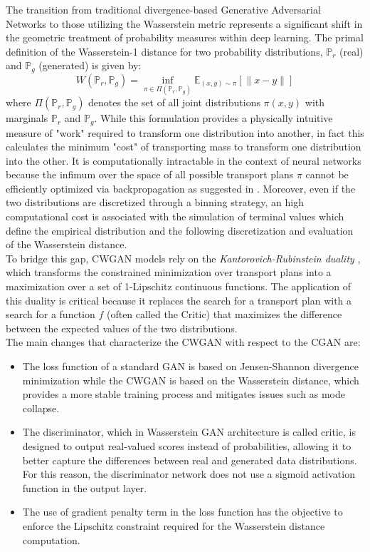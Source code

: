 The transition from traditional divergence-based
Generative Adversarial Networks to those utilizing the Wasserstein metric 
represents a significant shift in the geometric treatment of probability 
measures within deep learning. 
The primal definition of the Wasserstein-1 distance 
for two probability distributions, $\mathbb{P}_r$ (real) and $\mathbb{P}_g$ (generated) is given 
by:
\begin{equation*}
    W(\mathbb{P}_r, \mathbb{P}_g) = \inf_{\pi \in \Pi(\mathbb{P}_r, \mathbb{P}_g)} \mathbb{E}_{(x, y) \sim \pi} [\|x - y\|]
\end{equation*}
where $\Pi(\mathbb{P}_r, \mathbb{P}_g)$ denotes the set of all joint distributions $\pi(x, y)$ with marginals $\mathbb{P}_r$ and $\mathbb{P}_g$.
While this formulation provides a physically intuitive measure of "work" required to transform one distribution into another, in fact this calculates the minimum "cost" of transporting mass to transform one distribution into the other.
It is computationally intractable in the context of neural networks because the infimum over the space of 
all possible transport plans $\pi$ cannot be efficiently optimized via backpropagation as suggested in \cite{background:wgan}.
Moreover, even if the two distributions are discretized through a binning strategy, an high computational cost is associated with the simulation of terminal values which define the empirical distribution and the following
discretization and evaluation of the Wasserstein distance.\\

To bridge this gap, CWGAN models rely on the \emph{Kantorovich-Rubinstein duality} \cite{intro:duality}, which transforms the constrained minimization over transport plans into a maximization over a set of 1-Lipschitz continuous functions.
The application of this duality is critical because it replaces the search for a transport plan with a search for a function $f$ (often called the Critic) that maximizes the difference between the expected values of the two distributions.\\


The main changes that characterize the CWGAN with respect to the CGAN are:
\begin{itemize}
    \item The loss function of a standard GAN is based on Jensen-Shannon divergence minimization while the CWGAN is based on the Wasserstein distance, which provides a more stable training process and mitigates issues such as mode collapse.
    \item The discriminator, which in Wasserstein GAN architecture is called critic, is designed to output real-valued scores instead of probabilities, allowing it to better capture the differences between real and generated data distributions.
    For this reason, the discriminator network does not use a sigmoid activation function in the output layer.
    \item The use of gradient penalty term in the loss function has the objective to enforce the Lipschitz constraint required for the Wasserstein distance computation.    
\end{itemize}

